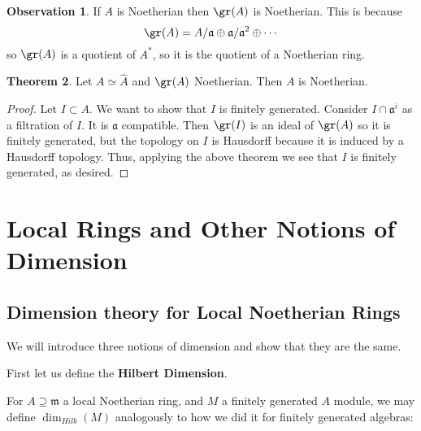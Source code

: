 \documentclass[12 pt]{article}
\theoremstyle{definition}
\newtheorem{theorem}{Theorem}[section]
\newtheorem{obs}[theorem]{Observation}
\newcommand\fa{{\mathfrak a}}
\begin{document}
\begin{obs} If $A$ is Noetherian then $\gr(A)$ is Noetherian. This is because
\[\gr(A) = A/\fa \oplus \fa/\fa^2 \oplus \cdots\]
so $\gr(A)$ is a quotient of $A^*$, so it is the quotient of a Noetherian ring.
\end{obs}

\begin{theorem} Let $A \simeq \hat{A}$ and $\gr(A)$ Noetherian. Then $A$ is Noetherian.
\end{theorem}
\begin{proof} Let $I \subset A$. We want to show that $I$ is finitely generated. Consider $I \cap \fa^i$ as a filtration of $I$. It is $\fa$ compatible. Then $\gr(I)$ is an ideal of $\gr(A)$ so it is finitely generated, but the topology on $I$ is Hausdorff because it is induced by a Hausdorff topology. Thus, applying the above theorem we see that $I$ is finitely generated, as desired.
\end{proof}



\newpage


\section{Local Rings and Other Notions of Dimension}



\subsection{Dimension theory for Local Noetherian Rings}

We will introduce three notions of dimension and show that they are the same.

First let us define the \textbf{Hilbert Dimension}.

For $A \supseteq \mathfrak{m}$ a local Noetherian ring, and $M$ a finitely generated $A$ module, we may define $\dim_{Hilb}(M)$ analogously to how we did it for finitely generated algebras:
\end{document}
